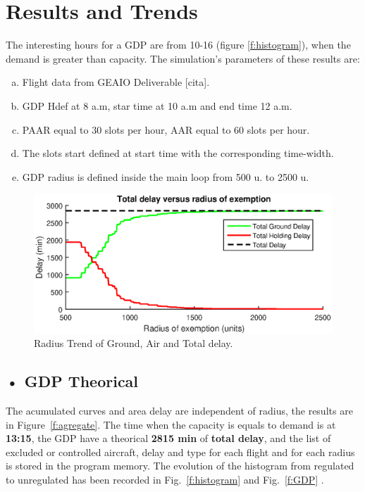 \documentclass[final,1p]{elsarticle}
\begin{document}
\section{Results and Trends}
\label{Sec:Sect4}

The interesting hours for a GDP are from 10-16 (figure \ref{f:histogram}), when the demand is greater than capacity. The simulation's parameters of these results are:
\begin{enumerate}[a.]
\item Flight data from GEAIO Deliverable [cita].
\item GDP Hdef at 8 a.m, star time at 10 a.m and end time 12 a.m.
\item PAAR equal to 30 slots per hour, AAR equal to 60 slots per hour.
\item The slots start defined at start time with the corresponding time-width.
\item GDP radius is defined inside the main loop from 500 u. to 2500 u.
\end{enumerate}

 \begin{figure}[h]
 \centering
 \includegraphics[width=5in]{./figs/radius.eps}
 \caption{Radius Trend of Ground, Air and Total delay.}
 \label{f:radious}
 \end{figure} 

\subsection{• GDP Theorical}
\label{subSec:theorical}

The acumulated curves and area delay are independent of radius, the results are in Figure~\ref{f:agregate}. The time when the capacity is equals to demand is at \textbf{13:15}, the GDP have a theorical \textbf{2815 min} of \textbf{total delay}, and the list of excluded or controlled aircraft, delay and type for each flight and for each radius is stored in the program memory.
The evolution of the histogram from regulated to unregulated has been recorded in Fig.~\ref{f:histogram} and Fig.~\ref{f:GDP} .
\end{document}
